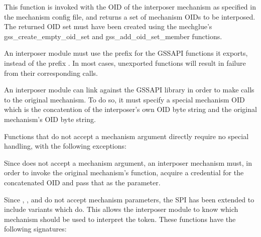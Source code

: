 \documentclass[letterpaper,10pt,english]{sphinxmanual}
\begin{document}
%
\begin{sphinxVerbatim}[commandchars=\\\{\}]
  
\end{sphinxVerbatim}

This function is invoked with the OID of the interposer mechanism as
specified in the mechanism config file, and returns a set of mechanism
OIDs to be interposed.  The returned OID set must have been created
using the mechglue’s gss\_create\_empty\_oid\_set and
gss\_add\_oid\_set\_member functions.

An interposer module must use the prefix  for the GSSAPI
functions it exports, instead of the prefix .  In most cases,
unexported  functions will result in failure from their
corresponding  calls.

An interposer module can link against the GSSAPI library in order to
make calls to the original mechanism.  To do so, it must specify a
special mechanism OID which is the concatention of the interposer’s
own OID byte string and the original mechanism’s OID byte string.

Functions that do not accept a mechanism argument directly require no
special handling, with the following exceptions:

Since  does not accept a mechanism argument,
an interposer mechanism must, in order to invoke the original
mechanism’s function, acquire a credential for the concatenated OID
and pass that as the  parameter.

Since , , and
 do not accept mechanism parameters, the SPI
has been extended to include variants which do.  This allows the
interposer module to know which mechanism should be used to interpret
the token.  These functions have the following signatures:
\end{document}
